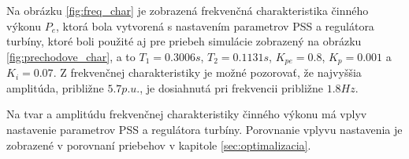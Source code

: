 Na obrázku \ref{fig:freq_char} je zobrazená frekvenčná charakteristika činného výkonu $P_e$, ktorá bola vytvorená s nastavením parametrov PSS a regulátora turbíny, ktoré boli použité aj pre priebeh simulácie zobrazený na obrázku \ref{fig:prechodove_char}, a to $T_1 = 0.3006 s$, $T_2 = 0.1131 s$, $K_{pe} = 0.8$, $K_p = 0.001$ a $K_i = 0.07$. Z frekvenčnej charakteristiky je možné pozorovať, že najvyššia amplitúda, približne $5.7 p.u.$, je dosiahnutá pri frekvencii približne $1.8 Hz$.

Na tvar a amplitúdu frekvenčnej charakteristiky činného výkonu má vplyv nastavenie parametrov PSS a regulátora turbíny. Porovnanie vplyvu nastavenia je zobrazené v porovnaní priebehov v kapitole \ref{sec:optimalizacia}.